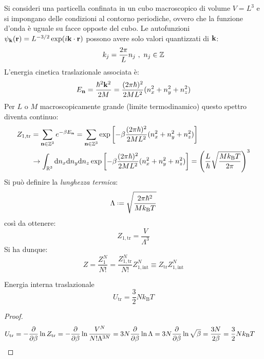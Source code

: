 Si consideri una particella confinata in un cubo macroscopico di volume $ V = L^3 $ e si impongano delle condizioni al contorno periodiche, ovvero che la funzione d'onda è uguale su facce opposte del cubo. Le autofunzioni $ \psi_{\mathbf{k}}(\mathbf{r}) = L^{-3/2} \exp(i \mathbf{k} \cdot \mathbf{r}) $ possono avere solo valori quantizzati di $ \mathbf{k} $:
\begin{equation*}
	k_j = \frac{2\pi}{L} n_j \,\,,\,\, n_j \in \mathbb{Z}
\end{equation*}
L'energia cinetica traslazionale associata è:
\begin{equation}
	E_{\mathbf{n}} = \frac{\hbar^2 \mathbf{k}^2}{2M} = \frac{(2\pi\hbar)^2}{2M L^2} (n_x^2 + n_y^2 + n_z^2)
\end{equation}
Per $ L $ o $ M $ macroscopicamente grande (limite termodinamico) questo spettro diventa continuo:
\begin{equation*}
	\begin{split}
		Z_{1,\text{tr}}
		& = \sum_{\mathbf{n} \in \mathbb{Z}^3} e^{-\beta E_{\mathbf{n}}} = \sum_{\mathbf{n} \in \mathbb{Z}^3} \exp \left[ - \beta \frac{(2\pi\hbar)^2}{2M L^2} (n_x^2 + n_y^2 + n_z^2) \right] \\
		& \rightarrow \int_{\mathbb{R}^3} \mathrm{d} n_x \mathrm{d} n_y \mathrm{d} n_z \exp \left[ -\beta \frac{(2\pi\hbar)^2}{2M L^2} (n_x^2 + n_y^2 + n_z^2) \right] = \left( \frac{L}{\hbar} \sqrt{\frac{M k_\text{B} T}{2\pi}} \right)^3
	\end{split}
\end{equation*}
Si può definire la \textit{lunghezza termica}:
\begin{equation}
	\Lambda \defeq \sqrt{\frac{2\pi\hbar^2}{M k_\text{B} T}}
\end{equation}
così da ottenere:
\begin{equation}
	Z_{1,\text{tr}} = \frac{V}{\Lambda^3}
\end{equation}
Si ha dunque:
\begin{equation*}
	Z = \frac{Z_1^N}{N!} = \frac{Z_{1,\text{tr}}^N}{N!} Z_{1,\text{int}}^N \equiv Z_\text{tr} Z_{1,\text{int}}^N
\end{equation*}

\begin{proposition}[before upper = {\tcbtitle}]{Energia interna traslazionale}{}
	\begin{equation}
		U_\text{tr} = \frac{3}{2} N k_\text{B} T
	\end{equation}

	\tcblower

	\begin{proof}
		\begin{equation*}
			\begin{split}
				U_\text{tr}
				& = - \frac{\partial}{\partial \beta} \ln Z_\text{tr} = - \frac{\partial}{\partial \beta} \ln \frac{V^N}{N! \Lambda^{3N}} = 3N \frac{\partial}{\partial \beta} \ln \Lambda = 3N \frac{\partial}{\partial \beta} \ln \sqrt{\beta} = \frac{3N}{2\beta} = \frac{3}{2} N k_\text{B} T
			\end{split}
		\end{equation*}
	\end{proof}
\end{proposition}

